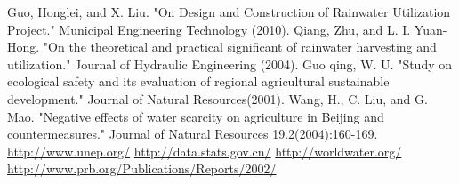 \documentclass{mcmthesis}
\begin{document}
\begin{thebibliography}{99}
 Guo, Honglei, and X. Liu. "On Design and Construction of Rainwater Utilization Project." Municipal Engineering Technology (2010). 
 Qiang, Zhu, and L. I. Yuan-Hong. "On the theoretical and practical significant of rainwater harvesting and utilization." Journal of Hydraulic Engineering (2004).
Guo qing, W. U. "Study on ecological safety and its evaluation of regional agricultural sustainable development." Journal of Natural Resources(2001).
 Wang, H., C. Liu, and G. Mao. "Negative effects of water scarcity on agriculture in Beijing and countermeasures." Journal of Natural Resources 19.2(2004):160-169.
\url{http://www.unep.org/}
\url{http://data.stats.gov.cn/}
\url{http://worldwater.org/}
\url{http://www.prb.org/Publications/Reports/2002/}

\end{thebibliography}
\end{document}
